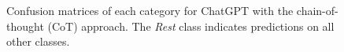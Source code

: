 \documentclass[letterpaper]{article}
\begin{document}
\begin{figure}[h!]
\centering
{}
\caption{Confusion matrices of each category for ChatGPT with the chain-of-thought (CoT) approach. The \textit{Rest} class indicates predictions on all other classes.}
\label{con-mat}
\end{figure}
\end{document}
